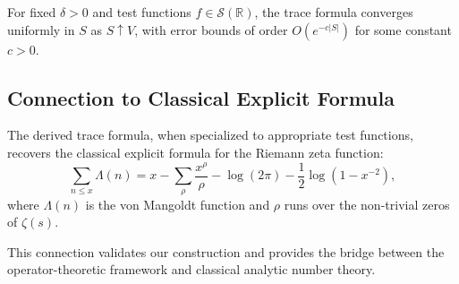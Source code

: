 \begin{theorem}
For fixed \( \delta > 0 \) and test functions \( f \in \mathcal{S}(\mathbb{R}) \), the trace formula converges uniformly in \( S \) as \( S \uparrow V \), with error bounds of order \( O(e^{-c|S|}) \) for some constant \( c > 0 \).
\end{theorem}

\subsection{Connection to Classical Explicit Formula}

The derived trace formula, when specialized to appropriate test functions, recovers the classical explicit formula for the Riemann zeta function:
\[
\sum_{n \leq x} \Lambda(n) = x - \sum_{\rho} \frac{x^\rho}{\rho} - \log(2\pi) - \frac{1}{2}\log(1-x^{-2}),
\]
where \( \Lambda(n) \) is the von Mangoldt function and \( \rho \) runs over the non-trivial zeros of \( \zeta(s) \).

This connection validates our construction and provides the bridge between the operator-theoretic framework and classical analytic number theory.